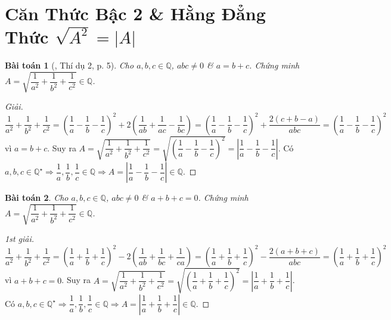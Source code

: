 \documentclass{article}
\newtheorem{baitoan}{Bài toán}
\begin{document}

\section{Căn Thức Bậc 2 \& Hằng Đẳng Thức $\sqrt{A^2} = |A|$}

\begin{baitoan}[\cite{Tuyen_Toan_9}, Thí dụ 2, p. 5]
	\label{prob: Tuyen_Toan_9 VD 2 p. 5}
	Cho $a,b,c\in\mathbb{Q}$, $abc\ne0$ \& $a = b + c$. Chứng minh $A = \sqrt{\dfrac{1}{a^2} + \dfrac{1}{b^2} + \dfrac{1}{c^2}}\in\mathbb{Q}$.
\end{baitoan}

\begin{proof}[Giải]
	$\dfrac{1}{a^2} + \dfrac{1}{b^2} + \dfrac{1}{c^2} = \left(\dfrac{1}{a} - \dfrac{1}{b} - \dfrac{1}{c}\right)^2 + 2\left(\dfrac{1}{ab} + \dfrac{1}{ac} - \dfrac{1}{bc}\right) = \left(\dfrac{1}{a} - \dfrac{1}{b} - \dfrac{1}{c}\right)^2 + \dfrac{2(c + b - a)}{abc} = \left(\dfrac{1}{a} - \dfrac{1}{b} - \dfrac{1}{c}\right)^2$ vì $a = b + c$. Suy ra $A = \sqrt{\dfrac{1}{a^2} + \dfrac{1}{b^2} + \dfrac{1}{c^2}} = \sqrt{\left(\dfrac{1}{a} - \dfrac{1}{b} - \dfrac{1}{c}\right)^2} = \left|\dfrac{1}{a} - \dfrac{1}{b} - \dfrac{1}{c}\right|$. Có $a,b,c\in\mathbb{Q}^\star\Rightarrow\dfrac{1}{a},\dfrac{1}{b},\dfrac{1}{c}\in\mathbb{Q}\Rightarrow A = \left|\dfrac{1}{a} - \dfrac{1}{b} - \dfrac{1}{c}\right|\in\mathbb{Q}$.
\end{proof}

\begin{baitoan}
	\label{prob: Mo rong Tuyen_Toan_9 VD 2 p. 5}
	Cho $a,b,c\in\mathbb{Q}$, $abc\ne0$ \& $a + b + c = 0$. Chứng minh $A = \sqrt{\dfrac{1}{a^2} + \dfrac{1}{b^2} + \dfrac{1}{c^2}}\in\mathbb{Q}$.
\end{baitoan}

\begin{proof}[1st giải]
	$\dfrac{1}{a^2} + \dfrac{1}{b^2} + \dfrac{1}{c^2} = \left(\dfrac{1}{a} + \dfrac{1}{b} + \dfrac{1}{c}\right)^2 - 2\left(\dfrac{1}{ab} + \dfrac{1}{bc} + \dfrac{1}{ca}\right) = \left(\dfrac{1}{a} + \dfrac{1}{b} + \dfrac{1}{c}\right)^2 - \dfrac{2(a + b + c)}{abc} = \left(\dfrac{1}{a} + \dfrac{1}{b} + \dfrac{1}{c}\right)^2$ vì $a + b + c = 0$. Suy ra $A = \sqrt{\dfrac{1}{a^2} + \dfrac{1}{b^2} + \dfrac{1}{c^2}} = \sqrt{\left(\dfrac{1}{a} + \dfrac{1}{b} + \dfrac{1}{c}\right)^2} = \left|\dfrac{1}{a} + \dfrac{1}{b} + \dfrac{1}{c}\right|$. Có $a,b,c\in\mathbb{Q}^\star\Rightarrow\dfrac{1}{a},\dfrac{1}{b},\dfrac{1}{c}\in\mathbb{Q}\Rightarrow A =\left|\dfrac{1}{a} + \dfrac{1}{b} + \dfrac{1}{c}\right|\in\mathbb{Q}$.
\end{proof}
\end{document}
